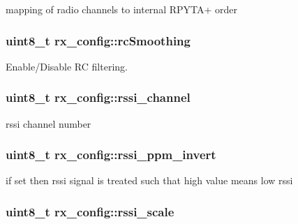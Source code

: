 mapping of radio channels to internal R\+P\+Y\+T\+A+ order 

\hypertarget{structrx__config_a78c1783d3447facd6ef8a949ae506c0a}{
\subsubsection[{rc\+Smoothing}]{\setlength{\rightskip}{0pt plus 5cm}uint8\+\_\+t rx\+\_\+config\+::rc\+Smoothing}}\label{structrx__config_a78c1783d3447facd6ef8a949ae506c0a}


Enable/\+Disable R\+C filtering. 

\hypertarget{structrx__config_a69cfd398b4b4da28a68e7d22725d164c}{
\subsubsection[{rssi\+\_\+channel}]{\setlength{\rightskip}{0pt plus 5cm}uint8\+\_\+t rx\+\_\+config\+::rssi\+\_\+channel}}\label{structrx__config_a69cfd398b4b4da28a68e7d22725d164c}


rssi channel number 

\hypertarget{structrx__config_ad67738c81cf1ae5770fe4a6bd731e207}{
\subsubsection[{rssi\+\_\+ppm\+\_\+invert}]{\setlength{\rightskip}{0pt plus 5cm}uint8\+\_\+t rx\+\_\+config\+::rssi\+\_\+ppm\+\_\+invert}}\label{structrx__config_ad67738c81cf1ae5770fe4a6bd731e207}


if set then rssi signal is treated such that high value means low rssi 

\hypertarget{structrx__config_a0dc3cd39fba01b57143e0a65f421126c}{
\subsubsection[{rssi\+\_\+scale}]{\setlength{\rightskip}{0pt plus 5cm}uint8\+\_\+t rx\+\_\+config\+::rssi\+\_\+scale}}\label{structrx__config_a0dc3cd39fba01b57143e0a65f421126c}


